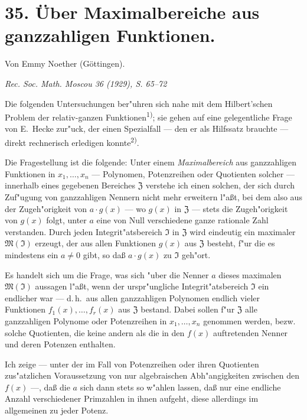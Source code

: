 \section*{35. Über Maximalbereiche aus ganzzahligen Funktionen.}

\begin{center}
Von Emmy Noether (Göttingen).\par
\emph{Rec. Soc. Math. Moscou 36 (1929), S. 65--72}
\end{center}




Die folgenden Untersuchungen ber"uhren sich nahe mit dem Hilbert'schen Problem der relativ-ganzen Funktionen\textsuperscript{1)}; sie gehen auf eine gelegentliche Frage von E.\ Hecke zur"uck, der einen Spezialfall --- den er als Hilfssatz brauchte --- direkt rechnerisch erledigen konnte\textsuperscript{2)}.

Die Fragestellung ist die folgende: Unter einem \textit{Maximalbereich} aus ganzzahligen Funktionen in $x_1,\ldots,x_n$ --- Polynomen, Potenzreihen oder Quotienten solcher --- innerhalb eines gegebenen Bereiches $\mathfrak{Z}$ verstehe ich einen solchen, der sich durch Zuf"ugung von ganzzahligen Nennern nicht mehr erweitern l"a\ss t, bei dem also aus der Zugeh"origkeit von $a \cdot g(x)$ --- wo $g(x)$ in $\mathfrak{Z}$ --- stets die Zugeh"origkeit von $g(x)$ folgt, unter $a$ eine von Null verschiedene ganze rationale Zahl verstanden. Durch jeden Integrit"atsbereich $\mathfrak{I}$ in $\mathfrak{Z}$ wird eindeutig ein maximaler $\mathfrak{M}(\mathfrak{I})$ erzeugt, der aus allen Funktionen $g(x)$ aus $\mathfrak{Z}$ besteht, f"ur die es mindestens ein $a \neq 0$ gibt, so da\ss{} $a \cdot g(x)$ zu $\mathfrak{I}$ geh"ort.

Es handelt sich um die Frage, was sich "uber die Nenner $a$ dieses maximalen $\mathfrak{M}(\mathfrak{I})$ aussagen l"a\ss t, wenn der urspr"ungliche Integrit"atsbereich $\mathfrak{I}$ ein endlicher war --- d.\,h.\ aus allen ganzzahligen Polynomen endlich vieler Funktionen $f_1(x),\ldots,f_r(x)$ aus $\mathfrak{Z}$ bestand. Dabei sollen f"ur $\mathfrak{Z}$ alle ganzzahligen Polynome oder Potenzreihen in $x_1,\ldots,x_n$ genommen werden, bezw. solche Quotienten, die keine andern als die in den $f(x)$ auftretenden Nenner und deren Potenzen enthalten.

Ich zeige --- unter der im Fall von Potenzreihen oder ihren Quotienten zus"atzlichen Voraussetzung von nur algebraischen Abh"angigkeiten zwischen den $f(x)$ ---, da\ss{} die $a$ sich dann stets so w"ahlen lassen, da\ss{} nur eine endliche Anzahl verschiedener Primzahlen in ihnen aufgeht, diese allerdings im allgemeinen zu jeder Potenz.

